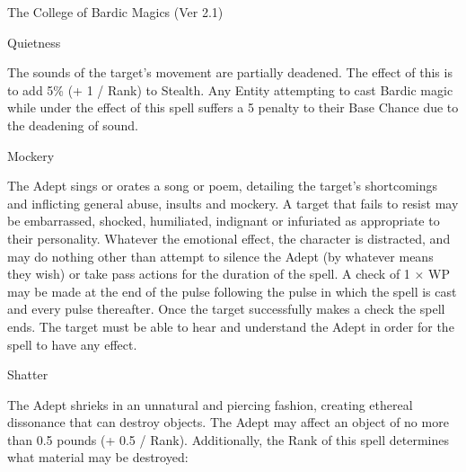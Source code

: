 \begin{Chapter}{The College of Bardic Magics (Ver 2.1)}
\begin{spell}[G-5]{Quietness}

\begin{effects}
The sounds of the target’s movement are partially deadened. The effect
of this is to add 5\% (+ 1 / Rank) to Stealth.  Any Entity attempting
to cast Bardic magic while under the effect of this spell suffers a 5
penalty to their Base Chance due to the deadening of sound.
\end{effects}
\end{spell}

\begin{spell}[G-6]{Mockery}

\begin{effects}
The Adept sings or orates a song or poem, detailing the target’s
shortcomings and inflicting general abuse, insults and mockery.  A
target that fails to resist may be embarrassed, shocked, humiliated,
indignant or infuriated as appropriate to their personality.  Whatever
the emotional effect, the character is distracted, and may do nothing
other than attempt to silence the Adept (by whatever means they wish)
or take pass actions for the duration of the spell.  A check of 1 × WP
may be made at the end of the pulse following the pulse in which the
spell is cast and every pulse thereafter.  Once the target
successfully makes a check the spell ends.  The target must be able to
hear and understand the Adept in order for the spell to have any
effect.
\end{effects}
\end{spell}

\begin{spell}[G-7]{Shatter}

\begin{effects}
The Adept shrieks in an unnatural and piercing fashion, creating
ethereal dissonance that can destroy objects.  The Adept may affect an
object of no more than 0.5 pounds (+ 0.5 / Rank).  Additionally, the
Rank of this spell determines what material may be destroyed:


\end{effects}
\end{spell}
\end{Chapter}
